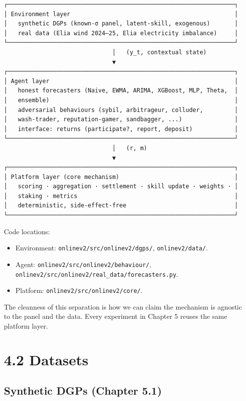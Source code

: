 \documentclass[11pt,a4paper,openany]{report}
\begin{document}
\begin{verbatim}
┌─────────────────────────────────────────────────────────────────┐
│ Environment layer                                               │
│   synthetic DGPs (known-σ panel, latent-skill, exogenous)       │
│   real data (Elia wind 2024–25, Elia electricity imbalance)     │
└─────────────────────────────────────────────────────────────────┘
                               │   (y_t, contextual state)
                               ▼
┌─────────────────────────────────────────────────────────────────┐
│ Agent layer                                                     │
│   honest forecasters (Naive, EWMA, ARIMA, XGBoost, MLP, Theta,  │
│   ensemble)                                                     │
│   adversarial behaviours (sybil, arbitrageur, colluder,         │
│   wash-trader, reputation-gamer, sandbagger, ...)               │
│   interface: returns (participate?, report, deposit)            │
└─────────────────────────────────────────────────────────────────┘
                               │   (r, m)
                               ▼
┌─────────────────────────────────────────────────────────────────┐
│ Platform layer (core mechanism)                                 │
│   scoring · aggregation · settlement · skill update · weights · │
│   staking · metrics                                             │
│   deterministic, side-effect-free                               │
└─────────────────────────────────────────────────────────────────┘
\end{verbatim}

Code locations:
\begin{itemize}
  \item Environment: \texttt{onlinev2/src/onlinev2/dgps/}, \texttt{onlinev2/data/}.
  \item Agent: \texttt{onlinev2/src/onlinev2/behaviour/},
    \texttt{onlinev2/src/onlinev2/real\_data/forecasters.py}.
  \item Platform: \texttt{onlinev2/src/onlinev2/core/}.
\end{itemize}

The cleanness of this separation is how we can claim the mechanism is
agnostic to the panel and the data. Every experiment in Chapter 5
reuses the same platform layer.

\section{4.2 Datasets}

\subsection{Synthetic DGPs (Chapter 5.1)}
\end{document}

